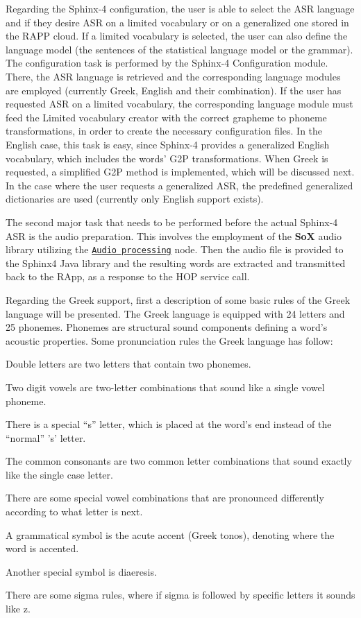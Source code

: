 Regarding the Sphinx-\/4 configuration, the user is able to select the A\-S\-R language and if they desire A\-S\-R on a limited vocabulary or on a generalized one stored in the R\-A\-P\-P cloud. If a limited vocabulary is selected, the user can also define the language model (the sentences of the statistical language model or the grammar). The configuration task is performed by the Sphinx-\/4 Configuration module. There, the A\-S\-R language is retrieved and the corresponding language modules are employed (currently Greek, English and their combination). If the user has requested A\-S\-R on a limited vocabulary, the corresponding language module must feed the Limited vocabulary creator with the correct grapheme to phoneme transformations, in order to create the necessary configuration files. In the English case, this task is easy, since Sphinx-\/4 provides a generalized English vocabulary, which includes the words' G2\-P transformations. When Greek is requested, a simplified G2\-P method is implemented, which will be discussed next. In the case where the user requests a generalized A\-S\-R, the predefined generalized dictionaries are used (currently only English support exists).

The second major task that needs to be performed before the actual Sphinx-\/4 A\-S\-R is the audio preparation. This involves the employment of the {\bfseries So\-X} audio library utilizing the \href{https://github.com/rapp-project/rapp-platform/wiki/RAPP-Audio-Processing}{\tt Audio processing} node. Then the audio file is provided to the Sphinx4 Java library and the resulting words are extracted and transmitted back to the R\-App, as a response to the H\-O\-P service call.

Regarding the Greek support, first a description of some basic rules of the Greek language will be presented. The Greek language is equipped with 24 letters and 25 phonemes. Phonemes are structural sound components defining a word’s acoustic properties. Some pronunciation rules the Greek language has follow\-:
\begin{DoxyItemize}
\item Double letters are two letters that contain two phonemes.
\item Two digit vowels are two-\/letter combinations that sound like a single vowel phoneme.
\item There is a special “s” letter, which is placed at the word’s end instead of the “normal” 's' letter.
\item The common consonants are two common letter combinations that sound exactly like the single case letter.
\item There are some special vowel combinations that are pronounced differently according to what letter is next.
\item A grammatical symbol is the acute accent (Greek tonos), denoting where the word is accented.
\item Another special symbol is diaeresis.
\item There are some sigma rules, where if sigma is followed by specific letters it sounds like z.
\end{DoxyItemize}

